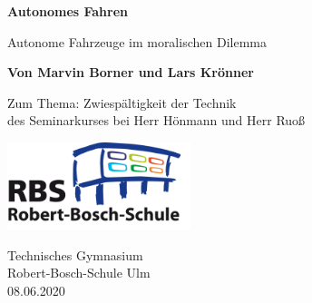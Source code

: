 \documentclass[a4paper, 12pt, openany]{book}
\begin{document}
    \titleformat{\chapter}[display]{\normalfont\bfseries}{}{0pt}{\huge}
    \titlespacing*{\chapter}{0pt}{-10pt}{20pt}

    \begin{titlepage}
        \begin{center}
            \vspace*{1cm}
            
            \Huge
            \textbf{Autonomes Fahren}
            
            \vspace{0.5cm}
            \Large
            Autonome Fahrzeuge im moralischen Dilemma
            
            \vspace{1.5cm}
            \large
            \textbf{Von Marvin Borner und Lars Krönner}
            \vfill
            
            Zum Thema: Zwiespältigkeit der Technik\\
            des Seminarkurses bei Herr Hönmann und Herr Ruoß
            
            \vspace{0.8cm}
            \includegraphics[width=0.4\textwidth]{rbs}
            
            Technisches Gymnasium\\
            Robert-Bosch-Schule Ulm\\
            08.06.2020
            
        \end{center}
    \end{titlepage}
\end{document}
